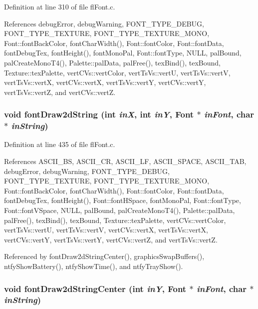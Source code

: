 Definition at line 310 of file fl\-Font.c.

References debug\-Error, debug\-Warning, FONT\_\-TYPE\_\-DEBUG, FONT\_\-TYPE\_\-TEXTURE, FONT\_\-TYPE\_\-TEXTURE\_\-MONO, Font::font\-Back\-Color, font\-Char\-Width(), Font::font\-Color, Font::font\-Data, font\-Debug\-Tex, font\-Height(), font\-Mono\-Pal, Font::font\-Type, NULL, pal\-Bound, pal\-Create\-Mono\-T4(), Palette::pal\-Data, pal\-Free(), tex\-Bind(), tex\-Bound, Texture::tex\-Palette, vert\-CVs::vert\-Color, vert\-Ts\-Vs::vert\-U, vert\-Ts\-Vs::vert\-V, vert\-Ts\-Vs::vert\-X, vert\-CVs::vert\-X, vert\-Ts\-Vs::vert\-Y, vert\-CVs::vert\-Y, vert\-Ts\-Vs::vert\-Z, and vert\-CVs::vert\-Z.
\subsubsection{\setlength{\rightskip}{0pt plus 5cm}void font\-Draw2d\-String (int {\em in\-X}, int {\em in\-Y}, {\bf Font} $\ast$ {\em in\-Font}, char $\ast$ {\em in\-String})}\label{flFont_8h_0f17a042bd1e5d440c89e3da55e20898}




Definition at line 435 of file fl\-Font.c.

References ASCII\_\-BS, ASCII\_\-CR, ASCII\_\-LF, ASCII\_\-SPACE, ASCII\_\-TAB, debug\-Error, debug\-Warning, FONT\_\-TYPE\_\-DEBUG, FONT\_\-TYPE\_\-TEXTURE, FONT\_\-TYPE\_\-TEXTURE\_\-MONO, Font::font\-Back\-Color, font\-Char\-Width(), Font::font\-Color, Font::font\-Data, font\-Debug\-Tex, font\-Height(), Font::font\-HSpace, font\-Mono\-Pal, Font::font\-Type, Font::font\-VSpace, NULL, pal\-Bound, pal\-Create\-Mono\-T4(), Palette::pal\-Data, pal\-Free(), tex\-Bind(), tex\-Bound, Texture::tex\-Palette, vert\-CVs::vert\-Color, vert\-Ts\-Vs::vert\-U, vert\-Ts\-Vs::vert\-V, vert\-CVs::vert\-X, vert\-Ts\-Vs::vert\-X, vert\-CVs::vert\-Y, vert\-Ts\-Vs::vert\-Y, vert\-CVs::vert\-Z, and vert\-Ts\-Vs::vert\-Z.

Referenced by font\-Draw2d\-String\-Center(), graphics\-Swap\-Buffers(), ntfy\-Show\-Battery(), ntfy\-Show\-Time(), and ntfy\-Tray\-Show().
\subsubsection{\setlength{\rightskip}{0pt plus 5cm}void font\-Draw2d\-String\-Center (int {\em in\-Y}, {\bf Font} $\ast$ {\em in\-Font}, char $\ast$ {\em in\-String})}\label{flFont_8h_c90a718ef77455f561eafddf1fb8cc7b}




